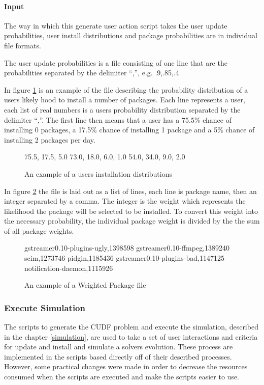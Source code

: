 \paragraph{Input}
The way in which this generate user action script takes the user update probabilities, user install distributions and package probabilities are in individual file formats.

The user update probabilities is a file consisting of one line that are the probabilities separated by the delimiter ``,'', e.g. .9,.85,.4

In figure \ref{userprob} is an example of the file describing the probability distribution of a users likely hood to install a number of packages.
Each line represents a user, each list of real numbers is a users probability distribution separated by the delimiter ``,''.
The first line then means that a user has a 75.5\% chance of installing 0 packages, a 17.5\% chance of installing 1 package and a 5\% chance of installing 2 packages per day.

\begin{figure}[htp]
\begin{center}
75.5, 17.5, 5.0
73.0, 18.0, 6.0, 1.0
54.0, 34.0, 9.0, 2.0
\caption[Install Distribution Example File]{An example of a users installation distributions}
\label{userprob}
\end{center}
\end{figure}

In figure \ref{packageprob} the file is laid out as a list of lines, each line is package name, then an integer separated by a comma.
The integer is the weight which represents the likelihood the package will be selected to be installed.
To convert this weight into the necessary probability, the individual package weight is divided by the the sum of all package weights. 

\begin{figure}[htp]
\begin{center}
gstreamer0.10-plugins-ugly,1398598
gstreamer0.10-ffmpeg,1389240
scim,1273746
pidgin,1185436
gstreamer0.10-plugins-bad,1147125
notification-daemon,1115926
\caption[Weighted Package File Example]{An example of a Weighted Package file }
\label{packageprob}
\end{center}
\end{figure}

\subsubsection{Execute Simulation}
The scripts to generate the CUDF problem and execute the simulation, described in the chapter \ref{simulation}, 
are used to take a set of user interactions and criteria for update and install and simulate a solvers evolution.
These process are implemented in the scripts based directly off of their described processes. 
However, some practical changes were made in order to decrease the resources consumed when the scripts are executed and make the scripts easier to use.

